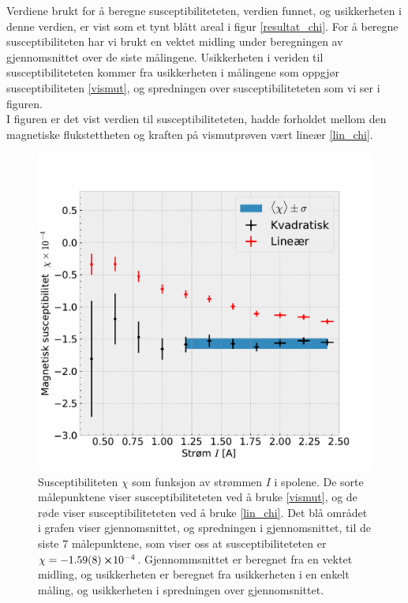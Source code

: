 \documentclass[%
 reprint,
nofootinbib,
aps,
]{revtex4-1}
\begin{document}
Verdiene brukt for å beregne susceptibiliteteten, verdien funnet, og usikkerheten i denne verdien, er vist som et tynt blått areal i figur \vref{resultat_chi}. For å beregne susceptibiliteten har vi brukt en vektet midling under beregningen av gjennomsnittet over de siste målingene. Usikkerheten i veriden til susceptibiliteteten kommer fra usikkerheten i målingene som oppgjør susceptibiliteten \eqref{vismut}, og spredningen over susceptibiliteteten som vi ser i figuren.\\
I figuren er det vist verdien til susceptibiliteteten, hadde forholdet mellom den magnetiske flukstettheten og kraften på vismutprøven vært lineær \eqref{lin_chi}.
\begin{figure}[h!]
  \centering
  \includegraphics[scale=0.45]{chi_effekt.pdf}
  \caption{Susceptibiliteten $\chi$ som funksjon av strømmen $I$ i spolene. De sorte målepunktene viser susceptibiliteteten ved å bruke \eqref{vismut}, og de røde viser susceptibiliteteten ved å bruke \eqref{lin_chi}. Det blå området i grafen viser gjennomsnittet, og spredningen i gjennomsnittet, til de siste $7$ målepunktene, som viser oss at susceptibiliteteten er $\chi = -\SI{1.59\pm0.08}\cross 10^{-4}$. Gjennommsnittet er beregnet fra en vektet midling, og usikkerheten er beregnet fra usikkerheten i en enkelt måling, og usikkerheten i spredningen over gjennomsnittet.}
  \label{resultat_chi}
\end{figure}
\end{document}
